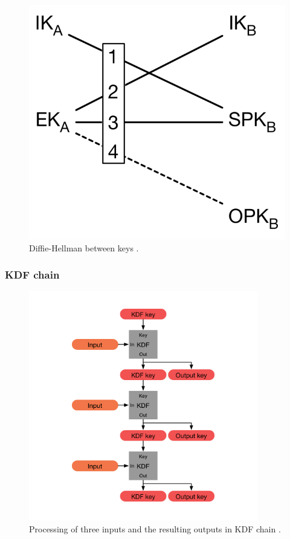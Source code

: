 \begin{figure}[H]
	\centering
	\includegraphics{figures/tripledh.png}
	\caption{Diffie-Hellman between keys \cite{tripledh}.}
	\label{fig:tripledh}
\end{figure}

\subsubsection{KDF chain}

\begin{figure}[H]
	\centering
	\includegraphics[width=10cm]{figures/kdfchain.png}
	\caption{Processing of three inputs and the resulting outputs in KDF chain \cite{doubleratchet}.}
	\label{fig:kdfchain}
\end{figure}


